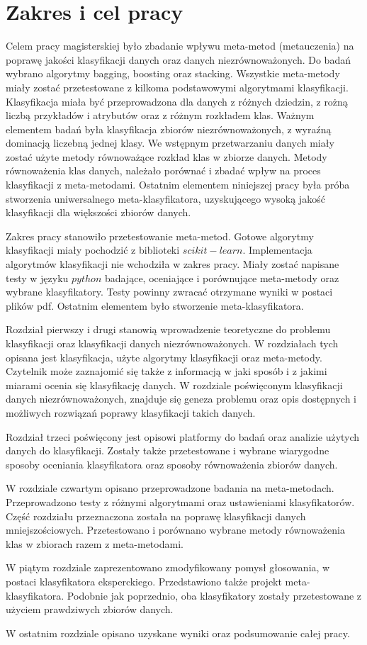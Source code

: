 \chapter*{Zakres i cel pracy}
Celem pracy magisterskiej było zbadanie wpływu meta-metod (metauczenia) na poprawę jakości klasyfikacji danych oraz danych niezrównoważonych. Do badań wybrano algorytmy bagging, boosting oraz stacking. Wszystkie meta-metody miały zostać przetestowane z kilkoma podstawowymi algorytmami klasyfikacji. Klasyfikacja miała być przeprowadzona dla danych z różnych dziedzin, z rożną liczbą przykładów i atrybutów oraz z różnym rozkładem klas. Ważnym elementem badań była klasyfikacja zbiorów niezrównoważonych, z wyraźną dominacją liczebną jednej klasy. We wstępnym przetwarzaniu danych miały zostać użyte metody równoważące rozkład klas w zbiorze danych. Metody równoważenia klas danych, należało porównać i zbadać wpływ na proces klasyfikacji z meta-metodami. Ostatnim elementem niniejszej pracy była próba stworzenia uniwersalnego meta-klasyfikatora, uzyskującego wysoką jakość klasyfikacji dla większości zbiorów danych. \par
Zakres pracy stanowiło przetestowanie meta-metod. Gotowe algorytmy klasyfikacji miały pochodzić z biblioteki $scikit-learn$. Implementacja algorytmów klasyfikacji nie wchodziła w zakres pracy. Miały zostać napisane testy w języku $python$ badające, oceniające i porównujące meta-metody oraz wybrane klasyfikatory. Testy powinny zwracać otrzymane wyniki w postaci plików pdf. Ostatnim elementem było stworzenie meta-klasyfikatora. \par
Rozdział pierwszy i drugi stanowią wprowadzenie teoretyczne do problemu klasyfikacji oraz klasyfikacji danych niezrównoważonych. W rozdziałach tych opisana jest klasyfikacja, użyte algorytmy klasyfikacji oraz meta-metody. Czytelnik może zaznajomić się także z informacją w jaki sposób i z jakimi miarami ocenia się klasyfikację danych. W rozdziale poświęconym klasyfikacji danych niezrównoważonych, znajduje się geneza problemu oraz opis dostępnych i możliwych rozwiązań poprawy klasyfikacji takich danych. \par
Rozdział trzeci poświęcony jest opisowi platformy do badań oraz analizie użytych danych do klasyfikacji. Zostały także przetestowane i wybrane wiarygodne sposoby oceniania klasyfikatora oraz sposoby równoważenia zbiorów danych. \par
W rozdziale czwartym opisano przeprowadzone badania na meta-metodach. Przeprowadzono testy z różnymi algorytmami oraz ustawieniami klasyfikatorów. Część rozdziału przeznaczona została na poprawę klasyfikacji danych mniejszościowych. Przetestowano i porównano wybrane metody równoważenia klas w zbiorach razem z meta-metodami. \par
W piątym rozdziale zaprezentowano zmodyfikowany pomysł głosowania, w postaci klasyfikatora eksperckiego. Przedstawiono także projekt meta-klasyfikatora. Podobnie jak poprzednio, oba klasyfikatory zostały przetestowane z użyciem prawdziwych zbiorów danych. \par
W ostatnim rozdziale opisano uzyskane wyniki oraz podsumowanie całej pracy.